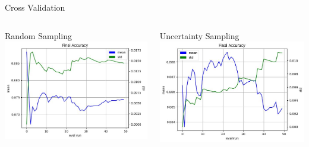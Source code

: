 \documentclass[aspectratio=169, 11pt, invertlogo]{ismll-slides}
\begin{document}
\begin{frame}[fragile]{Cross Validation}
	\begin{columns}
		\begin{column}{0.5\linewidth}
			Random Sampling
			\includegraphics[width=\linewidth]{pics/splice_random_convergence.jpg}
		\end{column}
		\hspace{3mm}
		\begin{column}{0.5\linewidth}
			Uncertainty Sampling
			\includegraphics[width=\linewidth]{pics/splice_margin_convergence.jpg}
		\end{column}
	\end{columns}
\end{frame}

\end{document}
